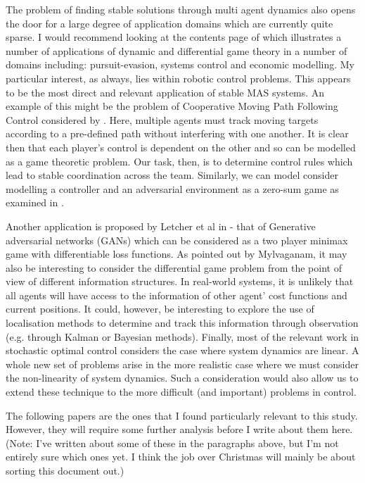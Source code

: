 \documentclass[preprint,11pt]{report}
\begin{document}
The problem of finding stable solutions through multi agent dynamics also opens the door for a large
degree of application domains which are currently quite sparse. I would recommend looking at the
contents page of \cite{Hamalainen1991DifferentialFinland} which illustrates a number of applications
of dynamic and differential game theory in a number of domains including: pursuit-evasion, systems
control and economic modelling. My particular interest, as always, lies within robotic control
problems. This appears to be the most direct and relevant application of stable MAS systems. An
example of this might be the problem of Cooperative Moving Path Following Control considered by
\cite{Reis2019RobustVehicles}. Here, multiple agents must track moving targets according to a
pre-defined path without interfering with one another. It is clear then that each player's control
is dependent on the other and so can be modelled as a game theoretic problem. Our task, then, is to
determine control rules which lead to stable coordination across the team. Similarly, we can model
consider modelling a controller and an adversarial environment as a zero-sum game as examined in
\cite{Marden2018AnnualControl}. 

Another application is proposed by Letcher et al in \cite{Letcher2019DifferentiableMechanics} - that
of Generative adversarial networks (GANs) which can be considered as a two player minimax game with
differentiable loss functions. As pointed out by Mylvaganam, it may also be interesting to consider
the differential game problem from the point of view of different information structures. In
real-world systems, it is unlikely that all agents will have access to the information of other
agent' cost functions and current positions. It could, however, be interesting to explore the use of
localisation methods to determine and track this information through observation (e.g. through
Kalman or Bayesian methods). Finally, most of the relevant work in stochastic optimal control
considers the case where system dynamics are linear. A whole new set of problems arise in the more
realistic case where we must consider the non-linearity of system dynamics. Such a consideration
would also allow us to extend these technique to the more difficult (and important) problems in
control.

The following papers \cite{Bailey2019FiniteDescent-Ascent, Bailey2019Multi-AgentSystem,
Boone2019FromTheory, DickensTheLearning, Berkenkamp2017SafeGuarantees,
Jin2018Stability-certifiedPerspective, Letcher2019DifferentiableMechanics} are the ones that I found
particularly relevant to this study. However, they will require some further analysis before I write
about them here. (Note: I've written about some of these in the paragraphs above, but I'm not
entirely sure which ones yet. I think the job over Christmas will mainly be about sorting this
document out.)
\end{document}

